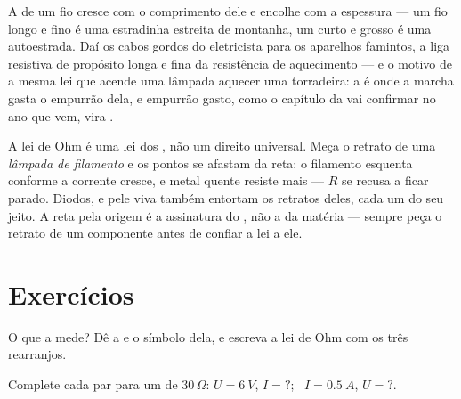 \begin{example}\label{ex:g8:ohms-law:wires}
A  de um fio cresce com o comprimento dele e encolhe com a
espessura --- um fio longo e fino é uma estradinha estreita de
montanha, um curto e grosso é uma autoestrada. Daí os cabos gordos do
eletricista para os aparelhos famintos, a liga resistiva de propósito
longa e fina da resistência de aquecimento --- e o motivo de a mesma
lei que acende uma lâmpada aquecer uma torradeira: a  é
onde a marcha gasta o empurrão dela, e empurrão gasto, como o
capítulo da  vai confirmar no ano que vem, vira .
\end{example}

\begin{remark}\label{rem:g8:ohms-law:limits}
A lei de Ohm é uma lei dos , não um direito universal. Meça
o retrato de uma \emph{lâmpada de filamento} e os pontos se afastam
da reta: o filamento esquenta conforme a corrente cresce, e metal
quente resiste mais --- $R$ se recusa a ficar parado. Diodos, 
e pele viva também entortam os retratos deles, cada um do seu jeito. A
reta pela origem é a assinatura do , não a da matéria ---
sempre peça o retrato de um componente antes de confiar a lei a ele.
\end{remark}

\section{Exercícios}

\begin{exercise}[$\star$]\label{exo:g8:ohms-law:1}
O que a  mede? Dê a  e o símbolo dela, e escreva a
lei de Ohm com os três rearranjos.
\end{exercise}

\begin{exercise}[$\star$]\label{exo:g8:ohms-law:2}
Complete cada par para um  de $30\,\Omega$:
$U = \qty{6}{V}$, $I = {?}$; \ $I = \qty{0.5}{A}$, $U = {?}$.
\end{exercise}

